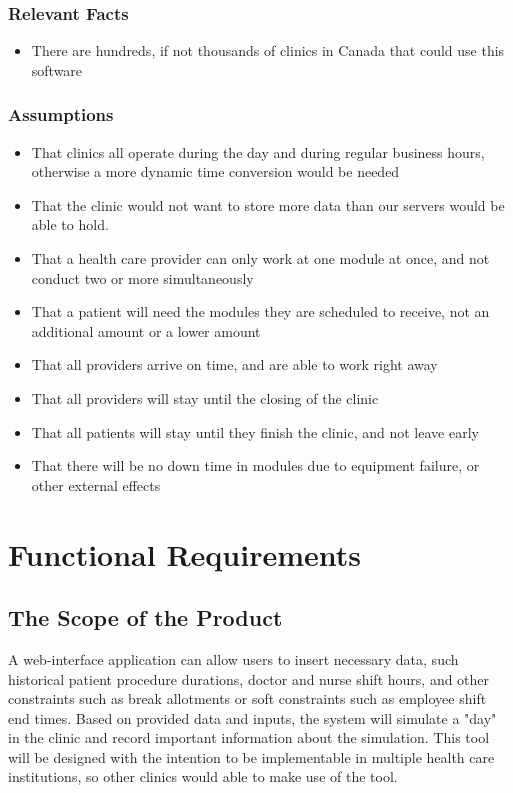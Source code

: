 \documentclass[12pt, titlepage]{article}
\begin{document}
\subsubsection{Relevant Facts}
\begin{itemize}
	\item There are hundreds, if not thousands of clinics in Canada that could use this software
\end{itemize}
\subsubsection{Assumptions}
\begin{itemize}
	\item That clinics all operate during the day and during regular business hours, otherwise a more dynamic time conversion would be needed
	\item That the clinic would not want to store more data than our servers would be able to hold.
	\item That a health care provider can only work at one module at once, and not conduct two or more simultaneously
	\item That a patient will need the modules they are scheduled to receive, not an additional amount or a lower amount
	\item That all providers arrive on time, and are able to work right away
	\item That all providers will stay until the closing of the clinic
	\item That all patients will stay until they finish the clinic, and not leave early
	\item That there will be no down time in modules due to equipment failure, or other external effects
\end{itemize}

\section{Functional Requirements} 
\subsection{The Scope of the Product}
A web-interface application can allow users to insert necessary data, such historical patient procedure durations, doctor and nurse shift hours, and other constraints such as break allotments or soft constraints such as employee shift end times. Based on provided data and inputs, the system will
simulate a "day" in the clinic and record important information about the simulation.  This tool will be designed with the intention to be implementable in multiple health care institutions, so other clinics would able to make use of the tool.
\end{document}
